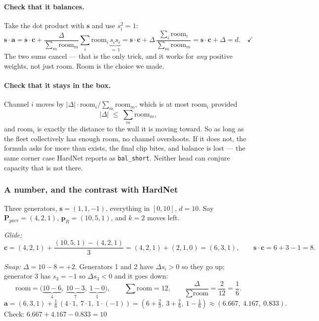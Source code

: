 \documentclass[11pt]{article}
\begin{document}
\paragraph{Check that it balances.} Take the dot product with $\mathbf{s}$ and use
$s_i^2=1$:
\[
\mathbf{s}\cdot\mathbf{a}
= \mathbf{s}\cdot\mathbf{c}
 + \frac{\Delta}{\sum_m \text{room}_m}\sum_i \text{room}_i\,\underbrace{s_i s_i}_{=\,1}
= \mathbf{s}\cdot\mathbf{c} + \Delta\,\frac{\sum_i \text{room}_i}{\sum_m \text{room}_m}
= \mathbf{s}\cdot\mathbf{c} + \Delta = d. \quad\checkmark
\]
The two sums cancel --- that is the only trick, and it works for \emph{any}
positive weights, not just room. Room is the choice we made.

\paragraph{Check that it stays in the box.} Channel $i$ moves by
$|\Delta|\cdot\text{room}_i / \sum_m\text{room}_m$, which is at most
$\text{room}_i$ provided
\[
|\Delta| \;\le\; \sum_m \text{room}_m ,
\]
and $\text{room}_i$ is exactly the distance to the wall it is moving toward. So
as long as the fleet collectively has enough room, no channel overshoots. If it
does not, the formula asks for more than exists, the final clip bites, and balance
is lost --- the same corner case HardNet reports as \texttt{bal\_short}. Neither
head can conjure capacity that is not there.

\subsubsection*{A number, and the contrast with HardNet}

Three generators, $\mathbf{s}=(1,1,-1)$, everything in $[0,10]$, $d=10$. Say
$\mathbf{P}_{\text{prev}}=(4,2,1)$, $\mathbf{p}_R=(10,5,1)$, and $k=2$ moves left.

\emph{Glide:}
\[
\mathbf{c} = (4,2,1) + \frac{(10,5,1)-(4,2,1)}{3} = (4,2,1)+(2,1,0) = (6,3,1),
\qquad \mathbf{s}\cdot\mathbf{c} = 6+3-1 = 8 .
\]

\emph{Snap:} $\Delta = 10-8 = +2$. Generators 1 and 2 have $\Delta s_i>0$ so they
go up; generator 3 has $s_3=-1$ so $\Delta s_3<0$ and it goes down:
\[
\text{room} = \bigl(\underbrace{10-6}_{4},\ \underbrace{10-3}_{7},\ \underbrace{1-0}_{1}\bigr),
\qquad \sum\text{room} = 12,
\qquad \frac{\Delta}{\sum\text{room}} = \frac{2}{12} = \frac16 .
\]
\[
\mathbf{a} = (6,3,1) + \tfrac16\,(4\cdot 1,\ 7\cdot 1,\ 1\cdot(-1))
= \left(6+\tfrac23,\ 3+\tfrac76,\ 1-\tfrac16\right) \approx (6.667,\ 4.167,\ 0.833).
\]
Check: $6.667+4.167-0.833 = 10$ \checkmark
\end{document}
